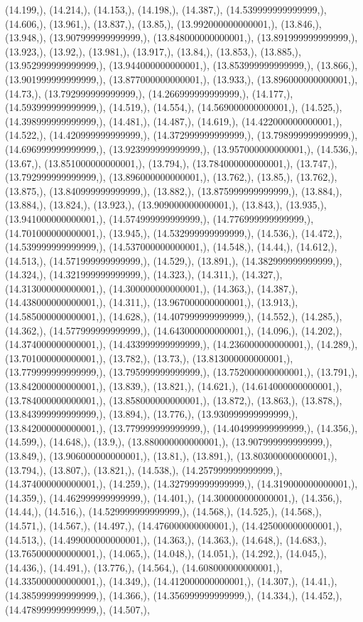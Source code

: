 \documentclass{article}
\begin{document}
(14.199,), (14.214,), (14.153,), (14.198,), (14.387,), (14.539999999999999,), (14.606,), (13.961,), (13.837,), (13.85,), (13.992000000000001,), (13.846,), (13.948,), (13.907999999999999,), (13.848000000000001,), (13.891999999999999,), (13.923,), (13.92,), (13.981,), (13.917,), (13.84,), (13.853,), (13.885,), (13.952999999999999,), (13.944000000000001,), (13.853999999999999,), (13.866,), (13.901999999999999,), (13.877000000000001,), (13.933,), (13.896000000000001,), (14.73,), (13.792999999999999,), (14.266999999999999,), (14.177,), (14.593999999999999,), (14.519,), (14.554,), (14.569000000000001,), (14.525,), (14.398999999999999,), (14.481,), (14.487,), (14.619,), (14.422000000000001,), (14.522,), (14.420999999999999,), (14.372999999999999,), (13.798999999999999,), (14.696999999999999,), (13.923999999999999,), (13.957000000000001,), (14.536,), (13.67,), (13.851000000000001,), (13.794,), (13.784000000000001,), (13.747,), (13.792999999999999,), (13.896000000000001,), (13.762,), (13.85,), (13.762,), (13.875,), (13.840999999999999,), (13.882,), (13.875999999999999,), (13.884,), (13.884,), (13.824,), (13.923,), (13.909000000000001,), (13.843,), (13.935,), (13.941000000000001,), (14.574999999999999,), (14.776999999999999,), (14.701000000000001,), (13.945,), (14.532999999999999,), (14.536,), (14.472,), (14.539999999999999,), (14.537000000000001,), (14.548,), (14.44,), (14.612,), (14.513,), (14.571999999999999,), (14.529,), (13.891,), (14.382999999999999,), (14.324,), (14.321999999999999,), (14.323,), (14.311,), (14.327,), (14.313000000000001,), (14.300000000000001,), (14.363,), (14.387,), (14.438000000000001,), (14.311,), (13.967000000000001,), (13.913,), (14.585000000000001,), (14.628,), (14.407999999999999,), (14.552,), (14.285,), (14.362,), (14.577999999999999,), (14.643000000000001,), (14.096,), (14.202,), (14.374000000000001,), (14.433999999999999,), (14.236000000000001,), (14.289,), (13.701000000000001,), (13.782,), (13.73,), (13.813000000000001,), (13.779999999999999,), (13.795999999999999,), (13.752000000000001,), (13.791,), (13.842000000000001,), (13.839,), (13.821,), (14.621,), (14.614000000000001,), (13.784000000000001,), (13.858000000000001,), (13.872,), (13.863,), (13.878,), (13.843999999999999,), (13.894,), (13.776,), (13.930999999999999,), (13.842000000000001,), (13.779999999999999,), (14.404999999999999,), (14.356,), (14.599,), (14.648,), (13.9,), (13.880000000000001,), (13.907999999999999,), (13.849,), (13.906000000000001,), (13.81,), (13.891,), (13.803000000000001,), (13.794,), (13.807,), (13.821,), (14.538,), (14.257999999999999,), (14.374000000000001,), (14.259,), (14.327999999999999,), (14.319000000000001,), (14.359,), (14.462999999999999,), (14.401,), (14.300000000000001,), (14.356,), (14.44,), (14.516,), (14.529999999999999,), (14.568,), (14.525,), (14.568,), (14.571,), (14.567,), (14.497,), (14.476000000000001,), (14.425000000000001,), (14.513,), (14.499000000000001,), (14.363,), (14.363,), (14.648,), (14.683,), (13.765000000000001,), (14.065,), (14.048,), (14.051,), (14.292,), (14.045,), (14.436,), (14.491,), (13.776,), (14.564,), (14.608000000000001,), (14.335000000000001,), (14.349,), (14.412000000000001,), (14.307,), (14.41,), (14.385999999999999,), (14.366,), (14.356999999999999,), (14.334,), (14.452,), (14.478999999999999,), (14.507,), 
\end{document}
